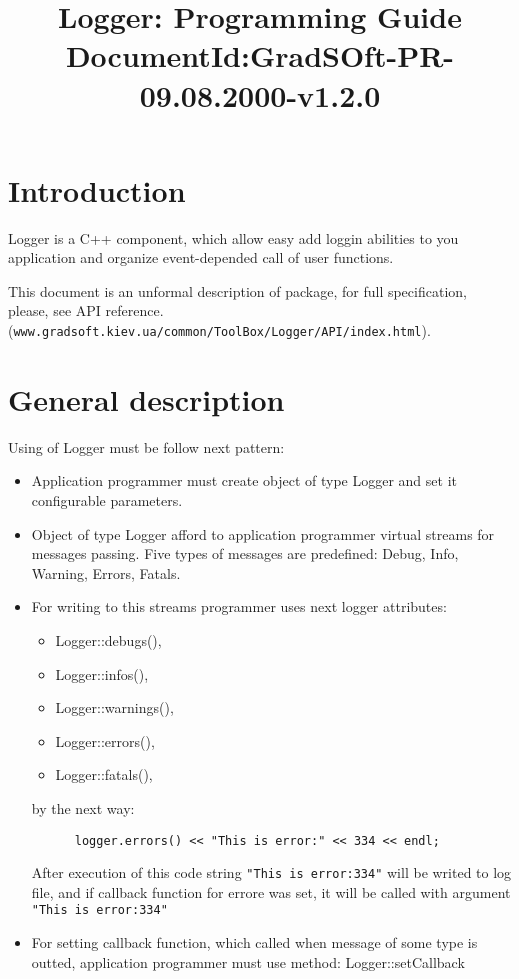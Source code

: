 \documentclass[10pt]{article}
\title{ Logger: Programming Guide  
       \newline
       \small{DocumentId:GradSOft-PR-09.08.2000-v1.2.0 }
      }
\begin{document}
\maketitle{}


\section{ Introduction }

 Logger is a C++ component, which allow easy add loggin abilities
  to you application 
  and organize event-depended call of user functions. 

 This document is an unformal description of package, for full specification,
 please, see API reference. 
 (\verb|www.gradsoft.kiev.ua/common/ToolBox/Logger/API/index.html|).

\section{ General description }

 Using of Logger must be  follow next pattern:

 \begin{itemize}
   \item Application programmer must create object of type Logger and set it
 configurable parameters.
   \item Object of type Logger afford to application programmer virtual streams for messages passing. Five types of messages are predefined: 
    Debug, Info, Warning, Errors, Fatals.
   \item For writing to this streams programmer uses next logger attributes:
    \begin{itemize}
        \item  Logger::debugs(),  
        \item  Logger::infos(),  
        \item  Logger::warnings(),  
        \item  Logger::errors(),  
        \item  Logger::fatals(),  
    \end{itemize}
    by the next way:
    \begin{verbatim}
      logger.errors() << "This is error:" << 334 << endl;
    \end{verbatim}
    After execution of this code string \verb|"This is error:334"| will be 
  writed to log file, and if callback function for errore was set, it will
  be called with argument \verb|"This is error:334"|
   \item 
     For setting callback function, which called when message of some type
    is outted, application programmer must use method:
     Logger::setCallback
 \end{itemize}
\end{document}
